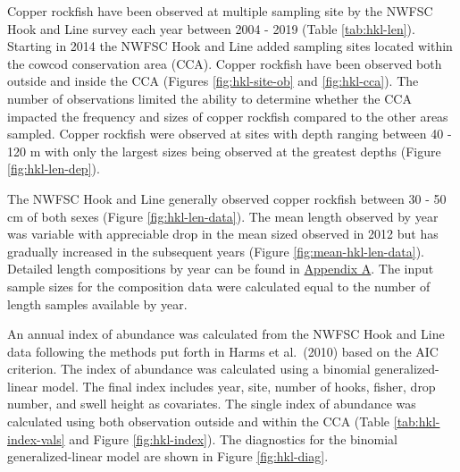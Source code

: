 \documentclass[11pt,
  english,
  a4paper,
]{article}
\begin{document}
\leavevmode\tagmcend\tagstructend\par


Copper rockfish have been observed at multiple sampling site by the NWFSC Hook and Line survey each year between 2004 - 2019 (Table \ref{tab:hkl-len}). Starting in 2014 the NWFSC Hook and Line added sampling sites located within the cowcod conservation area (CCA). Copper rockfish have been observed both outside and inside the CCA (Figures \ref{fig:hkl-site-ob} and \ref{fig:hkl-cca}). The number of observations limited the ability to determine whether the CCA impacted the frequency and sizes of copper rockfish compared to the other areas sampled. Copper rockfish were observed at sites with depth ranging between 40 - 120 m with only the largest sizes being observed at the greatest depths (Figure \ref{fig:hkl-len-dep}).

\leavevmode\tagmcend\tagstructend\par


The NWFSC Hook and Line generally observed copper rockfish between 30 - 50 cm of both sexes (Figure \ref{fig:hkl-len-data}). The mean length observed by year was variable with appreciable drop in the mean sized observed in 2012 but has gradually increased in the subsequent years (Figure \ref{fig:mean-hkl-len-data}). Detailed length compositions by year can be found in {\protect\hyperlink{append_a}{Appendix A}\leavevmode\tagmcend\tagstructend}. The input sample sizes for the composition data were calculated equal to the number of length samples available by year.

\leavevmode\tagmcend\tagstructend\par


An annual index of abundance was calculated from the NWFSC Hook and Line data following the methods put forth in Harms et al.~{(2010)\leavevmode\tagmcend\tagstructend} based on the AIC criterion. The index of abundance was calculated using a binomial generalized-linear model. The final index includes year, site, number of hooks, fisher, drop number, and swell height as covariates. The single index of abundance was calculated using both observation outside and within the CCA (Table \ref{tab:hkl-index-vals} and Figure \ref{fig:hkl-index}). The diagnostics for the binomial generalized-linear model are shown in Figure \ref{fig:hkl-diag}.
\end{document}
